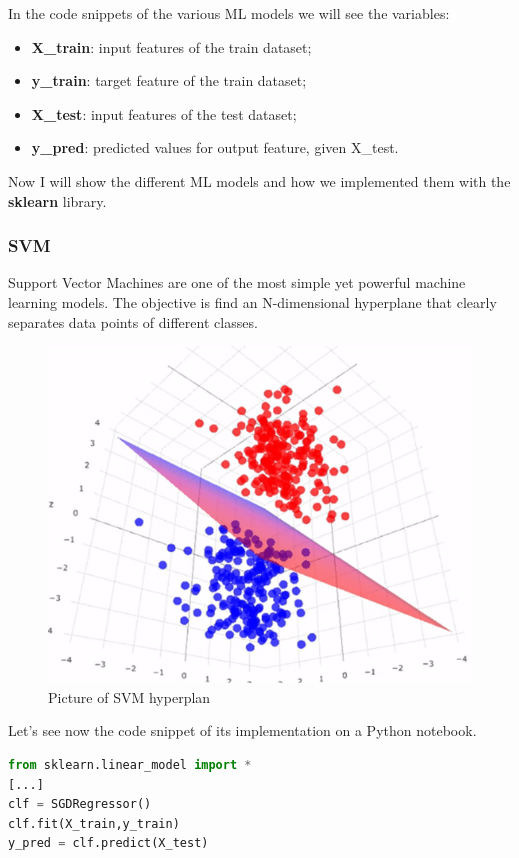 In the code snippets of the various ML models we will see the variables:
\begin{itemize}
    \item \textbf{X\_train}: input features of the train dataset;
    \item \textbf{y\_train}: target feature of the train dataset;
    \item \textbf{X\_test}: input features of the test dataset;
    \item \textbf{y\_pred}: predicted values for output feature, given X\_test.
\end{itemize}

Now I will show the different ML models and how we implemented them with the \textbf{sklearn} library.

\subsubsection{SVM}
Support Vector Machines are one of the most simple yet powerful machine learning models. The objective is find an N-dimensional hyperplane that clearly separates data points of different classes.

\begin{figure}
    \centering
    \includegraphics[scale=0.6]{res/ML/svm.png}
    \caption{Picture of SVM hyperplan}
\end{figure}

Let's see now the code snippet of its implementation on a Python notebook.

\begin{lstlisting}[language=Python, caption=SVM implementation]
from sklearn.linear_model import *
[...]
clf = SGDRegressor()
clf.fit(X_train,y_train)
y_pred = clf.predict(X_test)
\end{lstlisting}


